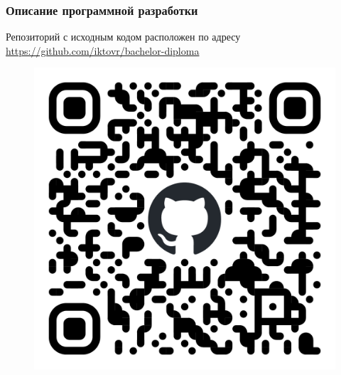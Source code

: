 \documentclass[pdf, hyperref={unicode}, aspectratio=169]{beamer}
\begin{document}
\begin{frame}
\frametitle{Описание программной разработки}

Репозиторий с исходным кодом расположен по адресу \url{https://github.com/iktovr/bachelor-diploma}

\begin{figure}
\includegraphics[height=0.7\textheight]{img/qr-code}
\end{figure}
\end{frame}
\end{document}
